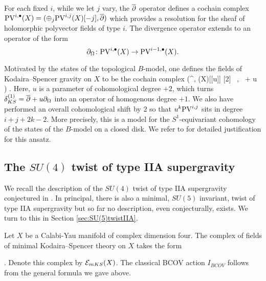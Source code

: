 For each fixed $i$, while we let $j$ vary, the $\overline{\partial}$ operator defines a cochain complex ${\rm PV}^{i,\bullet}(X) = (\oplus_j{\rm PV}^{i,j}(X) [-j], \overline{\partial})$ which provides a resolution for the sheaf of holomorphic polyvector fields of type $i$. 
The divergence operator extends to an operator of the form
\[
\partial_{\Omega} \colon {\rm PV}^{i,\bullet}(X) \to {\rm PV}^{i-1,\bullet}(X) .
\]

Motivated by the states of the topological $B$-model, one defines the fields of Kodaira--Spencer gravity on $X$ to be the cochain complex
\beqn\label{eqn:ks1}
\left(\PV^{\bu,\bu} (X)[[u]] [2] \, , \, \dbar + u \div\right) .
\eeqn 
Here, $u$ is a parameter of cohomological degree $+2$, which turns $\delta_{KS}^{(1)} = \overline{\partial} + u \partial_{\Omega}$ into an operator of homogenous degree $+1$. 
We also have performed an overall cohomological shift by $2$ so that $u^k {\rm PV}^{i,j}$ sits in degree $i+j+2k-2$. 
More precisely, this is a model for the $S^1$-equivariant cohomology of the states of the $B$-model on a closed disk. 
We refer to \cite{CLtypeI, CLsugra} for detailed justification for this ansatz. 


\parsec[s:poisson]


\parsec[s:ksaction] 


\parsec[s:minimalks]


\subsection{The $SU(4)$ twist of type IIA supergravity}\label{sec:SU(4)twist}

We recall the description of the $SU(4)$ twist of type IIA supergravity conjectured in \cite{CLsugra}. 
In principal, there is also a minimal, $SU(5)$ invariant, twist of type IIA supergravity but so far no description, even conjecturally, exists.
We turn to this in Section \ref{sec:SU(5)twistIIA}. 

Let $X$ be a Calabi-Yau manifold of complex dimension four. 
The complex of fields of minimal Kodaira--Spencer theory on $X$ takes the form
\beqn
{}.
\eeqn
Denote this complex by $\mathcal E_{mKS}(X)$. 
The classical BCOV action $I_{BCOV}$ follows from the general formula we gave above. 

